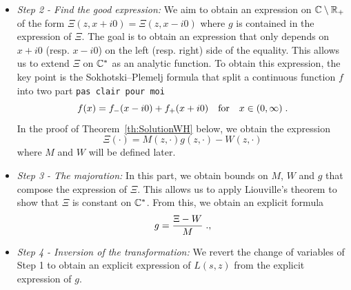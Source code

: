\begin{itemize}
\begin{figure}
        \label{f:WH}
        \caption{Illustration of the change of variables. The strip $\Re(s) \in (s_0, s_0+1)$ on the left is transformed in $\CC \setminus \RR_+$.  Red arrows show the \textit{"direction"} of the transformation. The line $s_0 + i\RR$ is transformed into $\RR_++i0$ and  $s_0 - i\RR$ is transformed into $\RR_+-i0$.}
    \end{figure}
    \item \textit{Step 2 - Find the good expression:} We aim to obtain an expression on $\CC \setminus \RR_+$ of the form 
    $ \Xi(z,x+i0) = \Xi(z,x-i0) $
    where $g$ is contained in the expression of $\Xi$. The goal is to obtain an expression that only depends on $x+i0$ (resp. $x-i0$) on the left (resp. right) side of the equality. This allows us to extend $\Xi$ on $\mathbb{C}^*$ as an analytic function. 
     To obtain this expression, the key point is the Sokhotski--Plemelj formula \cite{sokhotski1873definite} that split a continuous function $f$ into two part {\MD \tt pas clair pour moi} $$f(x) = f_-(x-i0) + f_+(x+i0) \quad \text{for} \quad x \in (0,\infty)\; .$$
    In the proof of Theorem~\ref{th:SolutionWH} below, we obtain the expression $$\Xi(\cdot) = M(z,\cdot)g(z, \cdot) -W(z,\cdot)$$  where $M$ and $W$ will be defined later. 
    \item \textit{Step 3 - The majoration:} In this part, we obtain bounds on $M$, $W$ and $g$ that compose the expression of $\Xi$. This allows us to apply Liouville's theorem to show that $\Xi$ is constant on $\mathbb{C}^*$. {\MD From this, we obtain an}  explicit formula 
    $$ g = \frac{\Xi - W}{M} \; .,$$
    \item \textit{Step 4 - Inversion of the transformation:} We revert the change of variables of Step 1 to obtain an explicit expression of $L(s,z)$ {\MD from the explicit expression of $g$}.    
\end{itemize}


